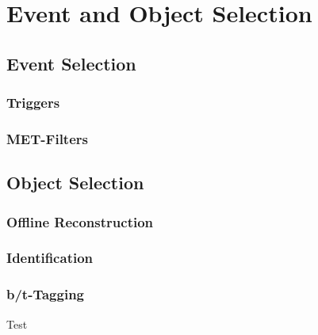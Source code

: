 
\chapter{Event and Object Selection}

\section{Event Selection}
\subsection{Triggers}
\subsection{MET-Filters}


\section{Object Selection}
\subsection{Offline Reconstruction}
\subsection{Identification}
\subsection{b/t-Tagging}
\label{sec:b_tagging}

Test\cite{CMS:CMS-PAS-BTV-15-001}